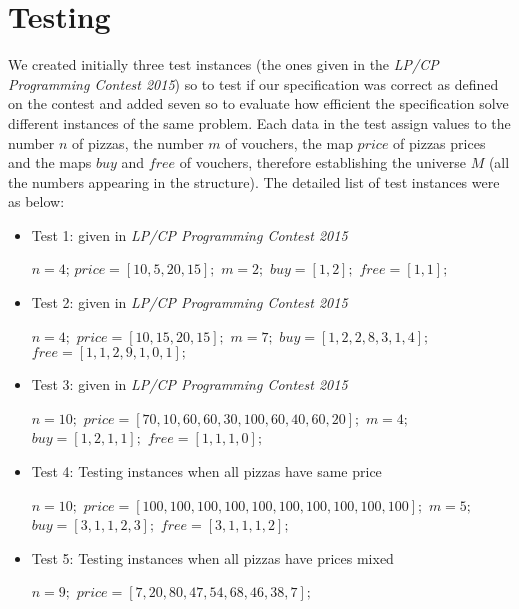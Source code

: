 \documentclass[conference]{IEEEtran}
\begin{document}
\section{Testing}
We created initially three test instances (the ones given in the \textit{LP/CP Programming Contest 2015}) so to test if our specification was correct as defined on the contest and added seven so to evaluate how efficient the specification solve different instances of the same problem. Each data in the test assign values to the number $n$ of pizzas, the number $m$ of vouchers, the map $price$ of pizzas prices and the maps $buy$ and $free$ of vouchers, therefore establishing the universe $M$ (all the numbers appearing in the structure). The detailed list of test instances were as below:
\begin{itemize}
\item Test 1: given in \textit{LP/CP Programming Contest 2015}
\begin{algorithmic}
\State $n = 4$;
\State $price = [10,5,20,15];$
\State $m = 2;$
\State $buy = [1,2];$
\State $free = [1,1];$
\\
\end{algorithmic}
\item Test 2: given in \textit{LP/CP Programming Contest 2015}
\begin{algorithmic}
\State $n = 4;$
\State $price = [10,15,20,15];$
\State $m = 7;$
\State $buy = [1,2,2,8,3,1,4];$
\State $free = [1,1,2,9,1,0,1];$
\\
\end{algorithmic}
\item Test 3: given in \textit{LP/CP Programming Contest 2015}
\begin{algorithmic}
\State $n = 10;$
\State $price = [70,10,60,60,30,100,60,40,60,20];$
\State $m = 4;$
\State $buy = [1,2,1,1];$
\State $free = [1,1,1,0];$
\\
\end{algorithmic}
\item Test 4: Testing instances when all pizzas have same price 
\begin{algorithmic}
\State $n = 10;$
\State $price = [100,100,100,100,100,100,100,100,100,100];$
\State $m = 5;$
\State $buy = [3,1,1,2,3];$
\State $free = [3,1,1,1,2];$
\\
\end{algorithmic}
\item Test 5: Testing instances when all pizzas have prices mixed 
\begin{algorithmic}
\State $n = 9;$
\State $price = [7,20,80,47,54,68,46,38,7];$

\end{algorithmic}
\end{itemize}
\end{document}
